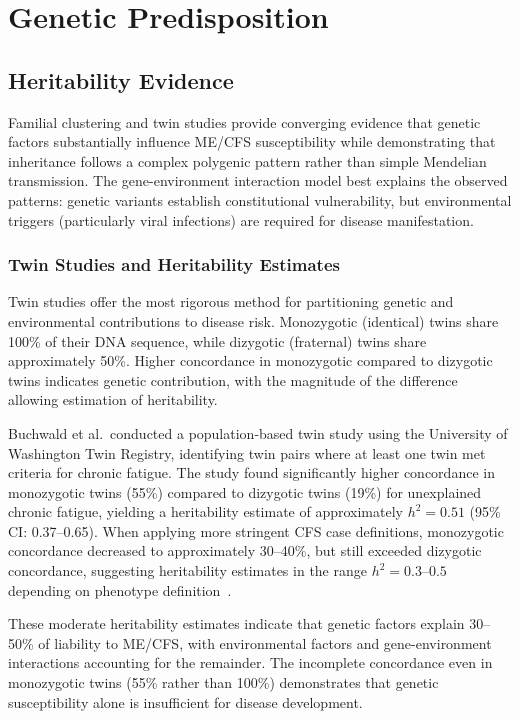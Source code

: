 \section{Genetic Predisposition}
\label{sec:genetics}

\subsection{Heritability Evidence}
\label{sec:heritability}

Familial clustering and twin studies provide converging evidence that genetic factors substantially influence ME/CFS susceptibility while demonstrating that inheritance follows a complex polygenic pattern rather than simple Mendelian transmission. The gene-environment interaction model best explains the observed patterns: genetic variants establish constitutional vulnerability, but environmental triggers (particularly viral infections) are required for disease manifestation.

\subsubsection{Twin Studies and Heritability Estimates}

Twin studies offer the most rigorous method for partitioning genetic and environmental contributions to disease risk. Monozygotic (identical) twins share 100\% of their DNA sequence, while dizygotic (fraternal) twins share approximately 50\%. Higher concordance in monozygotic compared to dizygotic twins indicates genetic contribution, with the magnitude of the difference allowing estimation of heritability.

\begin{observation}
Buchwald et al.\ conducted a population-based twin study using the University of Washington Twin Registry, identifying twin pairs where at least one twin met criteria for chronic fatigue. The study found significantly higher concordance in monozygotic twins (55\%) compared to dizygotic twins (19\%) for unexplained chronic fatigue, yielding a heritability estimate of approximately $h^2 = 0.51$ (95\% CI: 0.37--0.65). When applying more stringent CFS case definitions, monozygotic concordance decreased to approximately 30--40\%, but still exceeded dizygotic concordance, suggesting heritability estimates in the range $h^2 = 0.3$--$0.5$ depending on phenotype definition~\cite{Buchwald2001}.

These moderate heritability estimates indicate that genetic factors explain 30--50\% of liability to ME/CFS, with environmental factors and gene-environment interactions accounting for the remainder. The incomplete concordance even in monozygotic twins (55\% rather than 100\%) demonstrates that genetic susceptibility alone is insufficient for disease development.
\end{observation}

